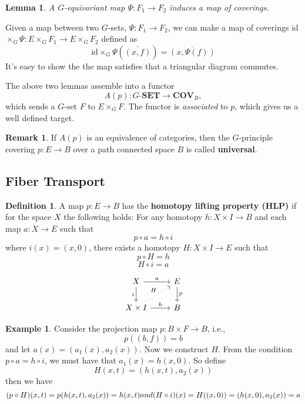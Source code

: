 \documentclass{article}
\newtheorem{lem}{Lemma}[section]
\theoremstyle{definition}
\newtheorem{exmp}{Example}[section]
\newtheorem{remark}{Remark}
\newtheorem{defn}{Definition}[section]
\begin{document}
\begin{lem}
A $G$-equivariant map $\Psi: F_1 \rightarrow F_2 $ induces a map of coverings.
\end{lem}
Given a map between two $G$-sets, $\Psi: F_1 \rightarrow F_2 $, we can make a map of coverings id$\times_G \Psi:E \times_{G} F_1\rightarrow E \times_{G} F_2 $ defined as $$\text{id}\times_G\Psi (\bar{(x,f)})=\bar{(x,\Psi(f))}$$ It's easy to show the the map satisfies that a triangular diagram commutes.

\noindent The above two lemmas assemble into a functor $$A(p): G\textbf{-SET} \rightarrow \textbf{COV}_B,$$ which sends a $G$-set $F$ to $E\times_{G}F$. The functor is \textit{associated} to $p$, which gives us a well defined target. 
\begin{remark}
If $A(p)$ is an equivalence of categories, then the $G$-principle covering $p: E \rightarrow B$ over a path connected space $B$ is called \textbf{universal}.
\end{remark}

\subsection{Fiber Transport}
\begin{defn}
A map $p: E \rightarrow B$ has the \textbf{homotopy lifting property (HLP)}  if for the space $X$ the following holds: For any  homotopy  $h: X \times I \rightarrow B$ and each map $a:X \rightarrow E$ such that $$p \circ a=h \circ i$$ where $i(x)=(x,0)$, there exists a homotopy $H: X \times I \rightarrow E$ such that $$p \circ H=h$$ $$H \circ i=a$$
\end{defn}

$$\begin{tikzcd}
X\arrow{r}{a}\arrow[d,"i"']  &E \arrow{d}{p}\\
X\times I \arrow{r}{h}\arrow[ur,"H",dotted] &B
\end{tikzcd}$$




\begin{exmp}
Consider the projection map $p:B \times F \rightarrow B$, i.e., $$p((b,f))=b$$ and let $a(x)=(a_1(x),a_2(x))$. Now we construct $H$. From the condition $p \circ a =h \circ i$, we must have that $a_1(x)=h(x,0)$. So define $$H(x,t)= (h(x,t),a_2(x))$$ then we have 
\[(p \circ H)(x,t)=p(h(x,t),a_2(x))\\ =h(x,t)$$ and $$(H \circ i)(x)=H((x,0))=(h(x,0),a_2(x))=a\]
\end{exmp}
\end{document}
